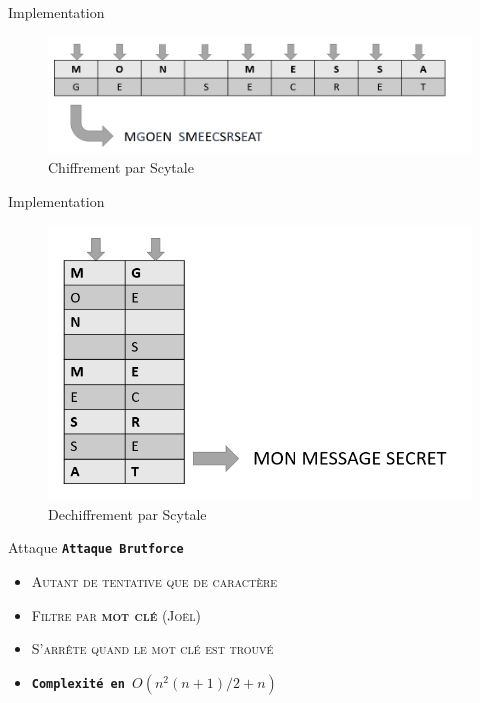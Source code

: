 \documentclass[10pt]{beamer}
\begin{document}
\begin{frame}{Implementation}
    \begin{figure}
        \includegraphics[scale=0.45]{scytale1.PNG}
         \caption{Chiffrement par Scytale}
  \end{figure}
 
\end{frame}
\begin{frame}{Implementation}
    \begin{figure}
        \includegraphics[scale=0.45]{scytale2.PNG}
        \caption{Dechiffrement par Scytale}
  \end{figure}
  
\end{frame}



{
\begin{frame}{Attaque}
\alert{\texttt{\textbf{Attaque Brutforce}}}
	\begin{itemize}
    \item \textsc{Autant de tentative que de caractère}
    \item \textsc{Filtre par \textbf{mot clé} (Joël)}
    \item \textsc{S'arrête quand le mot clé est trouvé}
    \item \texttt{\textbf{Complexité en  $O(n^2(n+1)/2 + n)$}}

  \end{itemize}
\end{frame}
}
\end{document}
